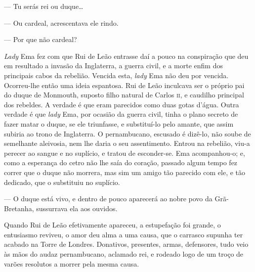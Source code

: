 --- Tu serás rei ou duque\ldots{}

--- Ou cardeal, acrescentava ele rindo.

--- Por que não cardeal?

\emph{Lady} Ema fez com que Rui de Leão entrasse daí a pouco na
conspiração que deu em resultado a invasão da Inglaterra, a guerra
civil, e a morte enfim dos principais cabos da rebelião. Vencida esta,
\emph{lady} Ema não deu por vencida. Ocorreu-lhe então uma ideia
espantosa. Rui de Leão inculcava ser o próprio pai do duque de Monmouth,
suposto filho natural de Carlos \textsc{ii}, e caudilho principal dos rebeldes. A
verdade é que eram parecidos como duas gotas d'água. Outra verdade é que
\emph{lady} Ema, por ocasião da guerra civil, tinha o plano secreto de
fazer matar o duque, se ele triunfasse, e substituí-lo pelo amante, que
assim subiria ao trono de Inglaterra. O pernambucano, escusado é
dizê-lo, não soube de semelhante aleivosia, nem lhe daria o seu
assentimento. Entrou na rebelião, viu-a perecer ao sangue e no suplício,
e tratou de esconder-se. Ema acompanhou-o; e, como a esperança do cetro
não lhe saía do coração, passado algum tempo fez correr que o duque não
morrera, mas sim um amigo tão parecido com ele, e tão dedicado, que o
substituiu no suplício.

--- O duque está vivo, e dentro de pouco aparecerá ao nobre povo da
Grã-Bretanha, sussurrava ela aos ouvidos.

Quando Rui de Leão efetivamente apareceu, a estupefação foi grande, o
entusiasmo reviveu, o amor deu alma a uma causa, que o carrasco supunha
ter acabado na Torre de Londres. Donativos, presentes, armas,
defensores, tudo veio às mãos do audaz pernambucano, aclamado rei, e
rodeado logo de um troço de varões resolutos a morrer pela mesma causa.


